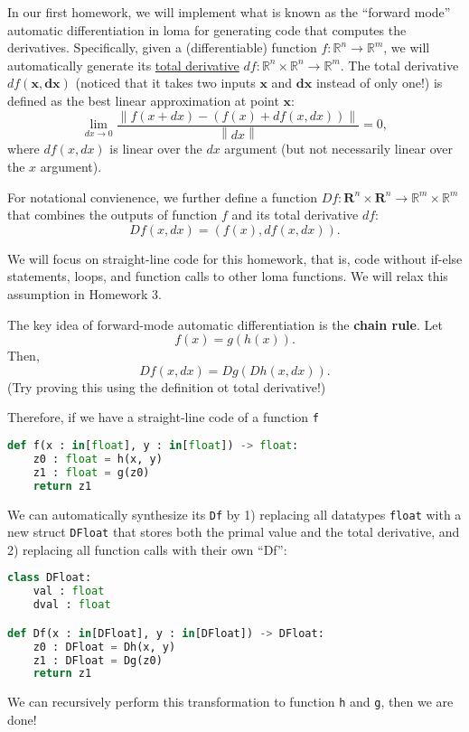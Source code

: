 




In our first homework, we will implement what is known as the ``forward mode'' automatic differentiation in loma for generating code that computes the derivatives. 
Specifically, given a (differentiable) function $f: \mathbb{R}^n \rightarrow \mathbb{R}^m$, we will automatically generate its \href{https://en.wikipedia.org/wiki/Total_derivative}{total derivative} $df: \mathbb{R}^n \times \mathbb{R}^n \rightarrow \mathbb{R}^m$. 
The total derivative $df(\mathbf{x}, \mathbf{dx})$ (noticed that it takes two inputs $\mathbf{x}$ and $\mathbf{dx}$ instead of only one!) is defined as the best linear approximation at point $\mathbf{x}$:
\begin{equation}
\lim_{dx \rightarrow 0} \frac{\left\|f(x + dx) - \left(f(x) + df(x, dx)\right)\right\|}{\left\|dx\right\|} = 0,
\label{eq:totalderiv}
\end{equation}
where $df(x, dx)$ is linear over the $dx$ argument (but not necessarily linear over the $x$ argument).

For notational convienence, we further define a function $Df: \mathbf{R}^n \times \mathbf{R}^n \rightarrow \mathbb{R}^m \times \mathbb{R}^m$ that combines the outputs of function $f$ and its total derivative $df$:
\begin{equation}
Df(x, dx) = \left(f(x), df(x, dx)\right).
\end{equation}

We will focus on straight-line code for this homework, that is, code without if-else statements, loops, and function calls to other loma functions. We will relax this assumption in Homework 3. 

The key idea of forward-mode automatic differentiation is the \textbf{chain rule}. Let
\begin{equation}
	f(x) = g(h(x)).
\end{equation}
Then,
\begin{equation}
	Df(x, dx) = Dg(Dh(x, dx)).
\end{equation}
(Try proving this using the definition ot total derivative!)

Therefore, if we have a straight-line code of a function \lstinline{f}
\begin{lstlisting}[language=Python]
def f(x : in[float], y : in[float]) -> float:
	z0 : float = h(x, y)
	z1 : float = g(z0)
	return z1
\end{lstlisting}
We can automatically synthesize its \lstinline{Df} by 1) replacing all datatypes \lstinline{float} with a new struct \lstinline{DFloat} that stores both the primal value and the total derivative, and 2) replacing all function calls with their own ``Df'':
\begin{lstlisting}[language=Python]
class DFloat:
	val : float
	dval : float

def Df(x : in[DFloat], y : in[DFloat]) -> DFloat:
	z0 : DFloat = Dh(x, y)
	z1 : DFloat = Dg(z0)
	return z1
\end{lstlisting}
We can recursively perform this transformation to function \lstinline{h} and \lstinline{g}, then we are done!

